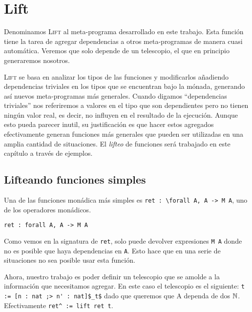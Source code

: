 \chapter{Lift}\label{ch:lift}

Denominamos \textsc{Lift} al meta-programa desarrollado en este trabajo.
Esta función tiene la tarea de agregar dependencias a otros meta-programas de manera cuasi automática. Veremos que solo depende de un telescopio, el que en principio generaremos nosotros.

\textsc{Lift} se basa en analizar los tipos de las funciones y modificarlos añadiendo dependencias triviales en los tipos que se encuentran bajo la mónada, generando así nuevos meta-programas más generales.
Cuando digamos ``dependencias triviales'' nos referiremos a valores en el tipo que son dependientes pero no tienen ningún valor real, es decir, no influyen en el resultado de la ejecución.
Aunque esto pueda parecer inutil, su justificación es que hacer estos agregados efectivamente generan funciones más generales que pueden ser utilizadas en una amplia cantidad de situaciones. 
El \emph{lifteo} de funciones será trabajado en este capítulo a través de ejemplos.

\section{Lifteando funciones simples}

Una de las funciones monádica más simples es \lstinline{ret : \forall A, A -> M A}, uno de los operadores monádicos.

\begin{lstlisting}[float=h,frame=tb,caption={Teorema y prueba en Coq},label=lst:ret]
ret : forall A, A -> M A
\end{lstlisting}

Como vemos en la signatura de \lstinline{ret}, solo puede devolver expresiones \lstinline{M A} donde no es posible que haya dependencias en \lstinline{A}. Esto hace que en una serie de situaciones no sea posible usar esta función.


Ahora, nuestro trabajo es poder definir un telescopio que se amolde a la información que necesitamos agregar.
En este caso el telescopio es el siguiente: \lstinline{t := [n : nat ;> n' : nat]$_t$} dado que queremos que \lstinline{}{A} dependa de dos $\mathbb{N}$. Efectivamente \lstinline{ret^ := lift ret t}.

